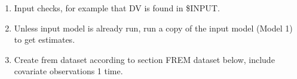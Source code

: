 \begin{enumerate}
\item Input checks, for example that DV is found in \$INPUT.

\item Unless input model is already run,
run a copy of the input model (Model 1) to get estimates.
\item Create frem dataset according to section FREM dataset below, include covariate observations 1 time.


\end{enumerate}
